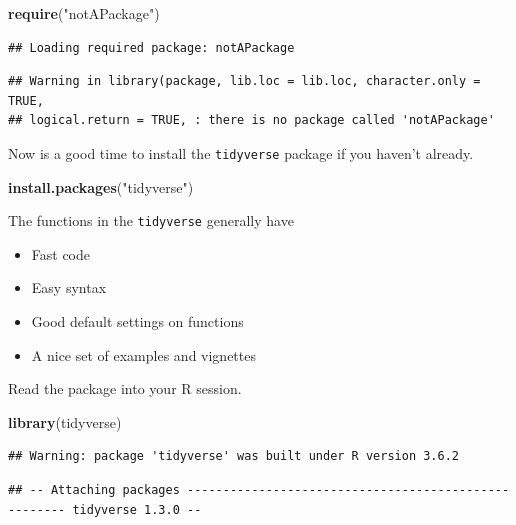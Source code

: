 \documentclass[
]{book}
\newenvironment{Shaded}{\begin{snugshade}}{\end{snugshade}}
\newcommand{\KeywordTok}[1]{\textcolor[rgb]{0.13,0.29,0.53}{\textbf{#1}}}
\newcommand{\NormalTok}[1]{#1}
\newcommand{\StringTok}[1]{\textcolor[rgb]{0.31,0.60,0.02}{#1}}
\theoremstyle{definition}
\theoremstyle{definition}
\theoremstyle{definition}
\theoremstyle{remark}
\begin{document}
\begin{Shaded}
\begin{Highlighting}[]
\KeywordTok{require}\NormalTok{(}\StringTok{"notAPackage"}\NormalTok{)}
\end{Highlighting}
\end{Shaded}

\begin{verbatim}
## Loading required package: notAPackage
\end{verbatim}

\begin{verbatim}
## Warning in library(package, lib.loc = lib.loc, character.only = TRUE,
## logical.return = TRUE, : there is no package called 'notAPackage'
\end{verbatim}

Now is a good time to install the \texttt{tidyverse} package if you haven't already.

\begin{Shaded}
\begin{Highlighting}[]
\KeywordTok{install.packages}\NormalTok{(}\StringTok{"tidyverse"}\NormalTok{)}
\end{Highlighting}
\end{Shaded}

The functions in the \texttt{tidyverse} generally have

\begin{itemize}
\item
  Fast code
\item
  Easy syntax
\item
  Good default settings on functions
\item
  A nice set of examples and vignettes
\end{itemize}

Read the package into your R session.

\begin{Shaded}
\begin{Highlighting}[]
\KeywordTok{library}\NormalTok{(tidyverse)}
\end{Highlighting}
\end{Shaded}

\begin{verbatim}
## Warning: package 'tidyverse' was built under R version 3.6.2
\end{verbatim}

\begin{verbatim}
## -- Attaching packages ----------------------------------------------------- tidyverse 1.3.0 --
\end{verbatim}
\end{document}
